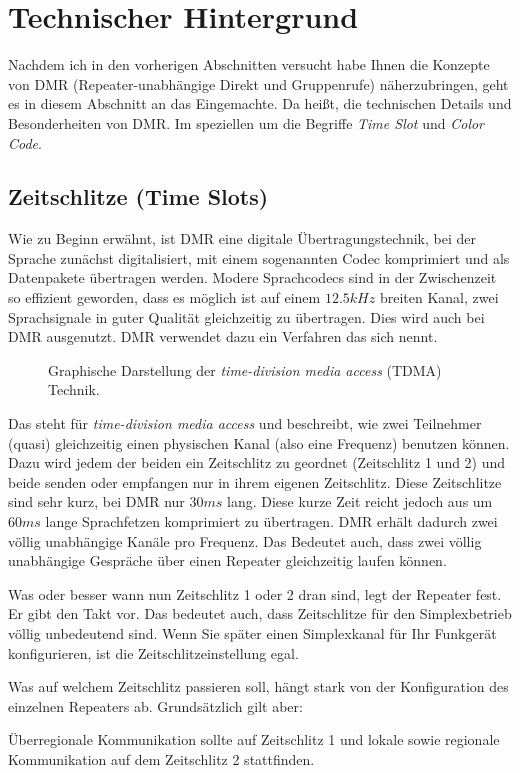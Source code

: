 \section{Technischer Hintergrund} \label{sec:technik}
Nachdem ich in den vorherigen Abschnitten versucht habe Ihnen die Konzepte von DMR (Repeater-unabhängige Direkt und Gruppenrufe) näherzubringen, geht es in diesem Abschnitt an das Eingemachte. Da heißt, die technischen Details und Besonderheiten von DMR. Im speziellen um die Begriffe \emph{Time Slot} und \emph{Color Code}.

\subsection{Zeitschlitze (Time Slots)} \label{sec:timeslot}
Wie zu Beginn erwähnt, ist DMR eine digitale Übertragungstechnik, bei der Sprache zunächst digitalisiert, mit einem sogenannten Codec komprimiert und als Datenpakete übertragen werden. Modere Sprachcodecs sind in der Zwischenzeit so effizient geworden, dass es möglich ist auf einem $12.5 kHz$ breiten Kanal, zwei Sprachsignale in guter Qualität gleichzeitig zu übertragen. Dies wird auch bei DMR ausgenutzt. DMR verwendet dazu ein Verfahren das sich  nennt. 

\begin{figure}[!ht]
 \centering
 
 \caption{Graphische Darstellung der \emph{time-division media access} (TDMA) Technik.}
\end{figure}

Das steht für \emph{time-division media access} und beschreibt, wie zwei Teilnehmer (quasi) gleichzeitig einen physischen Kanal (also eine Frequenz) benutzen können. Dazu wird jedem der beiden ein Zeitschlitz zu geordnet (Zeitschlitz 1 und 2) und beide senden oder empfangen nur in ihrem eigenen Zeitschlitz. Diese Zeitschlitze sind sehr kurz, bei DMR nur $30ms$ lang. Diese kurze Zeit reicht jedoch aus um $60ms$ lange Sprachfetzen komprimiert zu übertragen. DMR erhält dadurch zwei völlig unabhängige Kanäle pro Frequenz. Das Bedeutet auch, dass zwei völlig unabhängige Gespräche über einen Repeater gleichzeitig laufen können.

Was oder besser wann nun Zeitschlitz 1 oder 2 dran sind, legt der Repeater fest. Er gibt den Takt vor. Das bedeutet auch, dass Zeitschlitze für den Simplexbetrieb völlig unbedeutend sind. Wenn Sie später einen Simplexkanal für Ihr Funkgerät konfigurieren, ist die Zeitschlitzeinstellung egal.

Was auf welchem Zeitschlitz passieren soll, hängt stark von der Konfiguration des einzelnen Repeaters ab. Grundsätzlich gilt aber:
\begin{merke}
 Überregionale Kommunikation sollte auf Zeitschlitz 1 und lokale sowie regionale Kommunikation auf dem Zeitschlitz 2 stattfinden.
\end{merke} 

